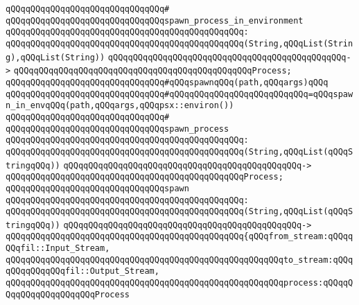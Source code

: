\verb|qQQqqQQqqQQqqQQqqQQqqQQqqQQqqQQq#|\newline
\verb|qQQqqQQqqQQqqQQqqQQqqQQqqQQqqQQqspawn_process_in_environment|\newline
\verb|qQQqqQQqqQQqqQQqqQQqqQQqqQQqqQQqqQQqqQQqqQQqqQQq:|\newline
\verb|qQQqqQQqqQQqqQQqqQQqqQQqqQQqqQQqqQQqqQQqqQQqqQQq(String,qQQqList(String),qQQqList(String))|\newline
\verb|qQQqqQQqqQQqqQQqqQQqqQQqqQQqqQQqqQQqqQQqqQQqqQQq->|\newline
\verb|qQQqqQQqqQQqqQQqqQQqqQQqqQQqqQQqqQQqqQQqqQQqqQQqProcess;|\newline
\newline
\verb|qQQqqQQqqQQqqQQqqQQqqQQqqQQqqQQq#qQQqspawnqQQq(path,qQQqargs)qQQq|\newline
\verb|qQQqqQQqqQQqqQQqqQQqqQQqqQQqqQQq#qQQqqQQqqQQqqQQqqQQqqQQqqQQq=qQQqspawn_in_envqQQq(path,qQQqargs,qQQqpsx::environ())|\newline
\verb|qQQqqQQqqQQqqQQqqQQqqQQqqQQqqQQq#|\newline
\verb|qQQqqQQqqQQqqQQqqQQqqQQqqQQqqQQqspawn_process|\newline
\verb|qQQqqQQqqQQqqQQqqQQqqQQqqQQqqQQqqQQqqQQqqQQqqQQq:|\newline
\verb|qQQqqQQqqQQqqQQqqQQqqQQqqQQqqQQqqQQqqQQqqQQqqQQq(String,qQQqList(qQQqStringqQQq))|\newline
\verb|qQQqqQQqqQQqqQQqqQQqqQQqqQQqqQQqqQQqqQQqqQQqqQQq->|\newline
\verb|qQQqqQQqqQQqqQQqqQQqqQQqqQQqqQQqqQQqqQQqqQQqqQQqProcess;|\newline
\newline
\verb|qQQqqQQqqQQqqQQqqQQqqQQqqQQqqQQqspawn|\newline
\verb|qQQqqQQqqQQqqQQqqQQqqQQqqQQqqQQqqQQqqQQqqQQqqQQq:|\newline
\verb|qQQqqQQqqQQqqQQqqQQqqQQqqQQqqQQqqQQqqQQqqQQqqQQq(String,qQQqList(qQQqStringqQQq))|\newline
\verb|qQQqqQQqqQQqqQQqqQQqqQQqqQQqqQQqqQQqqQQqqQQqqQQq->|\newline
\verb|qQQqqQQqqQQqqQQqqQQqqQQqqQQqqQQqqQQqqQQqqQQqqQQq{qQQqfrom_stream:qQQqqQQqfil::Input_Stream,|\newline
\verb|qQQqqQQqqQQqqQQqqQQqqQQqqQQqqQQqqQQqqQQqqQQqqQQqqQQqqQQqto_stream:qQQqqQQqqQQqqQQqfil::Output_Stream,|\newline
\verb|qQQqqQQqqQQqqQQqqQQqqQQqqQQqqQQqqQQqqQQqqQQqqQQqqQQqqQQqprocess:qQQqqQQqqQQqqQQqqQQqqQQqProcess|\newline
